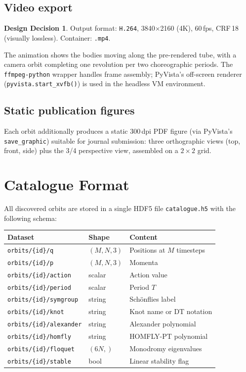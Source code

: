 \documentclass[12pt, a4paper]{article}
\theoremstyle{definition}
\newtheorem{decision}{Design Decision}
\begin{document}
\subsection{Video export}

\begin{decision}
Output format: \texttt{H.264}, 3840$\times$2160 (4K), 60\,fps,
CRF\,18 (visually lossless). Container: \texttt{.mp4}.
\end{decision}

The animation shows the bodies moving along the pre-rendered tube, with a
camera orbit completing one revolution per two choreographic periods.
The \texttt{ffmpeg-python} wrapper handles frame assembly; PyVista's
off-screen renderer (\texttt{pyvista.start\_xvfb()}) is used in the
headless VM environment.

\subsection{Static publication figures}

Each orbit additionally produces a static 300\,dpi PDF figure (via PyVista's
\texttt{save\_graphic}) suitable for journal submission: three orthographic
views (top, front, side) plus the 3/4 perspective view, assembled on a
$2\times 2$ grid.

\section{Catalogue Format}

All discovered orbits are stored in a single HDF5 file \texttt{catalogue.h5}
with the following schema:

\begin{center}
\begin{tabular}{lll}
\toprule
\textbf{Dataset} & \textbf{Shape} & \textbf{Content} \\
\midrule
\texttt{orbits/\{id\}/q}         & $(M, N, 3)$  & Positions at $M$ timesteps \\
\texttt{orbits/\{id\}/p}         & $(M, N, 3)$  & Momenta \\
\texttt{orbits/\{id\}/action}    & scalar       & Action value \\
\texttt{orbits/\{id\}/period}    & scalar       & Period $T$ \\
\texttt{orbits/\{id\}/symgroup}  & string       & Sch\"onflies label \\
\texttt{orbits/\{id\}/knot}      & string       & Knot name or DT notation \\
\texttt{orbits/\{id\}/alexander} & string       & Alexander polynomial \\
\texttt{orbits/\{id\}/homfly}    & string       & HOMFLY-PT polynomial \\
\texttt{orbits/\{id\}/floquet}   & $(6N,)$      & Monodromy eigenvalues \\
\texttt{orbits/\{id\}/stable}    & bool         & Linear stability flag \\
\bottomrule
\end{tabular}
\end{center}
\end{document}
